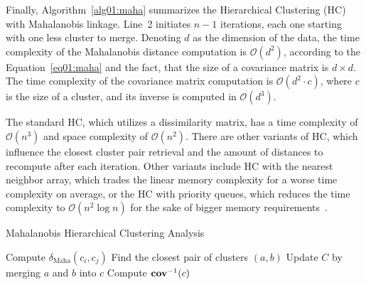 Finally, Algorithm~\ref{alg01:maha} summarizes the Hierarchical Clustering (HC) with Mahalanobis linkage. Line~2 initiates $n-1$ iterations, each one starting with one less cluster to merge. Denoting $d$ as the dimension of the data, the time complexity of the Mahalanobis distance computation is $\mathcal{O}(d^2)$, according to the Equation~\ref{eq01:maha} and the fact, that the size of a covariance matrix is $d \times d$. The time complexity of the covariance matrix computation is $\mathcal{O}(d^2 \cdot c)$, where $c$ is the size of a cluster, and its inverse is computed in $\mathcal{O}(d^3)$.

The standard HC, which utilizes a dissimilarity matrix, has a time complexity of $\mathcal{O}(n^3)$ and space complexity of $\mathcal{O}(n^2)$. There are other variants of HC, which influence the closest cluster pair retrieval and the amount of distances to recompute after each iteration. Other variants include HC with the nearest neighbor array, which trades the linear memory complexity for a worse time complexity on average, or the HC with priority queues, which reduces the time complexity to $\mathcal{O}(n^2 \log n)$ for the sake of bigger memory requirements~\cite{day1984efficient}.

\begin{algorithm}[t]
    \caption{Mahalanobis Hierarchical Clustering Analysis}
    \label{alg01:maha}
    \begin{algorithmic}[1]
                \State Compute $\delta_\text{Maha}(c_i,c_j)$ 
            \EndFor
            \State Find the closest pair of clusters $(a, b)$
            \State Update $C$ by merging $a$ and $b$ into $c$
            \State Compute $\operatorname{\textbf{cov}}^{-1}(c)$ 
        \EndWhile
        \EndProcedure
    \end{algorithmic}
\end{algorithm}



